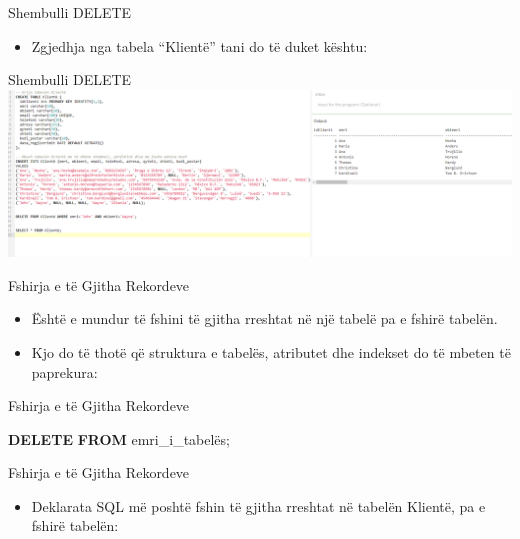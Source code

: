 \documentclass[
  ignorenonframetext,
]{beamer}
\newenvironment{Shaded}{\begin{snugshade}}{\end{snugshade}}
\newcommand{\KeywordTok}[1]{\textcolor[rgb]{0.13,0.29,0.53}{\textbf{#1}}}
\newcommand{\NormalTok}[1]{#1}
\providecommand{\tightlist}{%
  \setlength{\itemsep}{0pt}\setlength{\parskip}{0pt}}
\begin{document}
\begin{frame}{Shembulli DELETE}
\label{shembulli-delete-2}
\begin{itemize}
\tightlist
\item
  Zgjedhja nga tabela ``Klientë'' tani do të duket kështu:
\end{itemize}
\end{frame}

\begin{frame}{Shembulli DELETE}
\label{shembulli-delete-3}
\includegraphics{./Figs/query38.png}
\end{frame}

\begin{frame}{Fshirja e të Gjitha Rekordeve}
\label{fshirja-e-tuxeb-gjitha-rekordeve}
\begin{itemize}
\item
  Është e mundur të fshini të gjitha rreshtat në një tabelë pa e fshirë
  tabelën.
\item
  Kjo do të thotë që struktura e tabelës, atributet dhe indekset do të
  mbeten të paprekura:
\end{itemize}
\end{frame}

\begin{frame}[fragile]{Fshirja e të Gjitha Rekordeve}
\label{fshirja-e-tuxeb-gjitha-rekordeve-1}
\begin{Shaded}
\begin{Highlighting}[]
\KeywordTok{DELETE} \KeywordTok{FROM}\NormalTok{ emri\_i\_tabelës;}
\end{Highlighting}
\end{Shaded}
\end{frame}

\begin{frame}{Fshirja e të Gjitha Rekordeve}
\label{fshirja-e-tuxeb-gjitha-rekordeve-2}
\begin{itemize}
\tightlist
\item
  Deklarata SQL më poshtë fshin të gjitha rreshtat në tabelën Klientë,
  pa e fshirë tabelën:
\end{itemize}
\end{frame}
\end{document}
